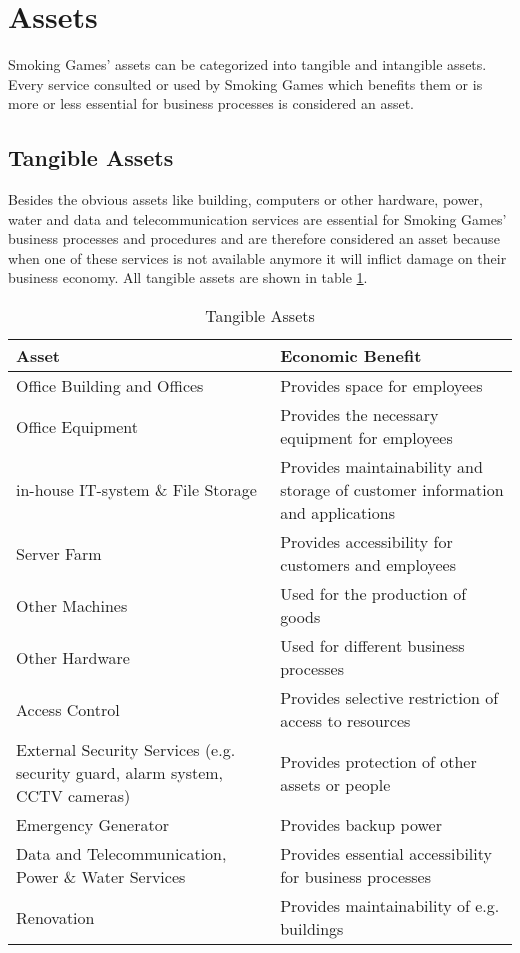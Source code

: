 \section{Assets}
Smoking Games' assets can be categorized into tangible and intangible assets. Every service consulted or used by Smoking Games which benefits them or is more or less essential for business processes is considered an asset.
\subsection{Tangible Assets}
Besides the obvious assets like building, computers or other hardware, power, water and data and telecommunication services are essential for Smoking Games' business processes and procedures and are therefore considered an asset because when one of these services is not available anymore it will inflict damage on their business economy. All tangible assets are shown in table \ref{tab:TangibleAssets}.
\begin{table}[h]
	\centering
	\begin{tabular}{l | l}
		\textbf{Asset} & \textbf{Economic Benefit}\\\hline\hline
		\parbox[t]{6cm}{Office Building and Offices} & \parbox[t]{6cm}{Provides space for employees}\\\hline
		\parbox[t]{6cm}{Office Equipment} & \parbox[t]{6cm}{Provides the necessary equipment for employees}\\\hline
		\parbox[t]{6cm}{in-house IT-system \& File Storage} & \parbox[t]{6cm}{Provides maintainability and storage of customer information and applications}\\\hline
		\parbox[t]{6cm}{Server Farm} & \parbox[t]{6cm}{Provides accessibility for customers and employees}\\\hline
		\parbox[t]{6cm}{Other Machines} & \parbox[t]{6cm}{Used for the production of goods}\\\hline
		\parbox[t]{6cm}{Other Hardware} & \parbox[t]{6cm}{Used for different business processes}\\\hline
		\parbox[t]{6cm}{Access Control} & \parbox[t]{6cm}{Provides selective restriction of access to resources}\\\hline
		\parbox[t]{6cm}{External Security Services (e.g. security guard, alarm system, CCTV cameras)} & \parbox[t]{6cm}{Provides protection of other assets or people}\\\hline
		\parbox[t]{6cm}{Emergency Generator} & \parbox[t]{6cm}{Provides backup power}\\\hline
		\parbox[t]{6cm}{Data and Telecommunication, Power \& Water Services} & \parbox[t]{6cm}{Provides essential accessibility for business processes}\\\hline
		\parbox[t]{6cm}{Renovation} & \parbox[t]{6cm}{Provides maintainability of e.g. buildings}\\
	\end{tabular}
	\caption{Tangible Assets}\label{tab:TangibleAssets}
\end{table}
